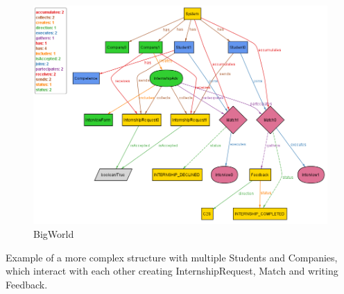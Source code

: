 \begin{figure}[h]
    \centering
    \includegraphics[width=1\textwidth]{Images/AlloyModel_images/BigWorld.png}
    \caption{BigWorld}
    \label{fig:figure2}
\end{figure}
Example of a more complex structure with multiple Students and Companies, which interact with each other creating InternshipRequest, Match and writing Feedback.
